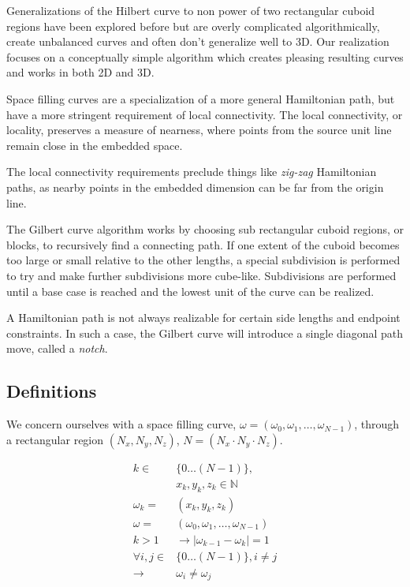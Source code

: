 Generalizations of the Hilbert curve to non power of two rectangular cuboid regions
have been explored before but are overly complicated algorithmically, create unbalanced
curves and often don't generalize well to 3D.
Our realization focuses on a conceptually simple algorithm which creates pleasing
resulting curves and works in both 2D and 3D.

Space filling curves are a specialization of a more general Hamiltonian path,
but have a more stringent requirement of local connectivity.
The local connectivity, or locality, preserves a measure of nearness, where
points from the source unit line remain close in the embedded space.

The local connectivity requirements
preclude things like \textit{zig-zag} Hamiltonian
paths, as nearby points in the embedded dimension can be far from the origin line.



The Gilbert curve algorithm works by choosing sub rectangular cuboid regions, or blocks,
to recursively find a connecting path.
If one extent of the cuboid becomes too large or small relative to the other lengths,
a special subdivision is performed to try and make further subdivisions more cube-like.
Subdivisions are performed until a base case is reached and the lowest unit of the curve
can be realized.

A Hamiltonian path is not always realizable for certain side lengths and endpoint constraints.
In such a case, the Gilbert curve will introduce a single diagonal path move, called a \textit{notch}.


\subsection{Definitions}

We concern ourselves with a space filling curve, $\omega = (\omega_0, \omega_1, \dots, \omega_{N-1})$,
through a rectangular region $( N _ x, N _ y, N _ z)$,  $N = (N _ x \cdot N _ y \cdot N _ z)$.


$$
\begin{array}{rl}
  k \in & \{ 0 \dots (N-1) \}, \\
  & x _ k, y _ k, z _ k \in \mathbb{N} \\
  \omega _ k = & ( x _ k, y _ k, z _ k ) \\
  \omega = & ( \omega _ 0, \omega _ 1, \dots, \omega _ {N-1} ) \\
  k>1  & \to | \omega _ {k - 1} - \omega _ {k} | = 1 \\
  \forall i,j \in & \{ 0 \dots (N-1) \}, i \ne j  \\
  \to & \omega _ i \ne \omega _ j
\end{array}
$$

